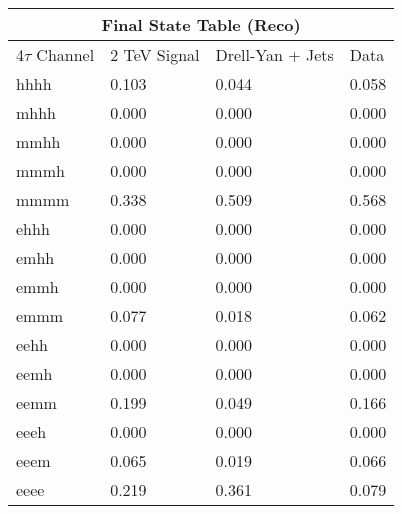 \documentclass{article}
\begin{document}
 
\begin{landscape} 
\centering 
\begin{tabular}{|p{4.5cm}|p{3cm}|p{3cm}|p{3cm}|}\hline 
\multicolumn{4}{|c|}{Final State Table (Reco)} \\ 
\hline 
4$\tau$ Channel & 2 TeV Signal & Drell-Yan + Jets & Data \\ 
\hline 
hhhh & 0.103 & 0.044 & 0.058\\
\hline 
mhhh & 0.000 & 0.000 & 0.000\\
\hline 
mmhh & 0.000 & 0.000 & 0.000\\
\hline 
mmmh & 0.000 & 0.000 & 0.000\\
\hline 
mmmm & 0.338 & 0.509 & 0.568\\
\hline 
ehhh & 0.000 & 0.000 & 0.000\\
\hline 
emhh & 0.000 & 0.000 & 0.000\\
\hline 
emmh & 0.000 & 0.000 & 0.000\\
\hline 
emmm & 0.077 & 0.018 & 0.062\\
\hline 
eehh & 0.000 & 0.000 & 0.000\\
\hline 
eemh & 0.000 & 0.000 & 0.000\\
\hline 
eemm & 0.199 & 0.049 & 0.166\\
\hline 
eeeh & 0.000 & 0.000 & 0.000\\
\hline 
eeem & 0.065 & 0.019 & 0.066\\
\hline 
eeee & 0.219 & 0.361 & 0.079\\
\hline 
\end{tabular} 
\end{landscape} 
\end{document}
